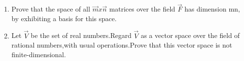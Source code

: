 \begin{enumerate}[label=\thesubsection.\arabic*.,ref=\thesubsection.\theenumi]
%
\\
\solution

%
\item Prove that the space of all $\vec{m} x \vec{n}$ matrices over the field $\vec{F}$ has dimension mn, by exhibiting a basis for this space. 
%
\\
\solution

%
\item Let $\vec{V}$ be the set of real numbers.Regard  $\vec{V}$  as a vector space over the field of rational numbers,with usual operations.Prove that this vector space is not finite-dimensional.
\\
\solution

\end{enumerate}
